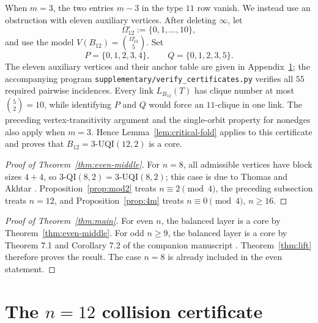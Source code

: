 \documentclass[11pt]{article}
\begin{document}
When \(m=3\), the two entries \(m-3\) in the type \(11\) row vanish.  We
instead use an obstruction with eleven auxiliary vertices.  After deleting
\(\infty\), let
\[
\Omega_{12}^{\circ}:=\{0,1,\ldots,10\},
\]
and use the model \(V(B_{12})=\binom{\Omega_{12}^{\circ}}5\).  Set
\[
P=\{0,1,2,3,4\},
\qquad
Q=\{0,1,2,3,5\}.
\]
The eleven auxiliary vertices and their anchor table are given in
Appendix~\ref{app:n12}; the accompanying program
\texttt{supplementary/verify\_certificates.py} verifies all \(55\) required
pairwise incidences.  Every link \(L_{B_{12}}(T)\) has clique number at most
\(\binom{5}{2}=10\), while identifying \(P\) and \(Q\) would force an
\(11\)-clique in one link.  The preceding vertex-transitivity argument and
the single-orbit property for nonedges also apply when \(m=3\).  Hence
Lemma~\ref{lem:critical-fold} applies to this certificate and proves that
\(B_{12}=3\text{-}\mathrm{UQI}(12,2)\) is a core.

\begin{proof}[Proof of Theorem~\ref{thm:even-middle}]
For \(n=8\), all admissible vertices have block sizes \(4+4\), so
\(3\text{-}\mathrm{QI}(8,2)=3\text{-}\mathrm{UQI}(8,2)\); this case is due
to Thomas and Akhtar \cite[Theorem 4]{ThomasAkhtar2026}.
Proposition~\ref{prop:mod2} treats
\(n\equiv2\pmod4\), the preceding subsection treats \(n=12\), and
Proposition~\ref{prop:4m} treats \(n\equiv0\pmod4\), \(n\ge16\).
\end{proof}

\begin{proof}[Proof of Theorem~\ref{thm:main}]
For even \(n\), the balanced layer is a core by
Theorem~\ref{thm:even-middle}.  For odd \(n\ge9\), the balanced layer is a
core by Theorem 7.1 and Corollary 7.2 of the companion manuscript
\cite{KimMergedJohnson2026}.  Theorem~\ref{thm:lift} therefore proves the
result.  The case \(n=8\) is already included in the even statement.
\end{proof}

\appendix

\section{The \texorpdfstring{\(n=12\)}{n=12} collision certificate}\label{app:n12}
\end{document}
